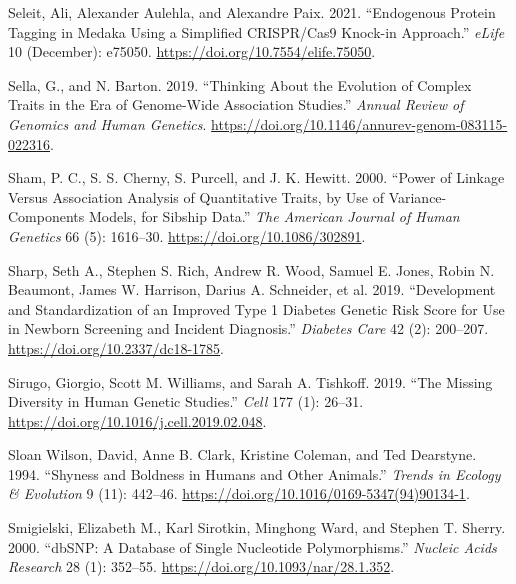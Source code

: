 \documentclass[
]{book}
\newlength{\cslhangindent}
\newlength{\cslentryspacingunit} %
\newenvironment{CSLReferences}[2] %
 {%
  \setlength{\parindent}{0pt}
  \ifodd #1
  \let\oldpar\par
  \def\par{\hangindent=\cslhangindent\oldpar}
  \fi
  \setlength{\parskip}{#2\cslentryspacingunit}
 }%
 {}
\begin{document}
\begin{CSLReferences}{1}{0}
\leavevmode{}%
Seleit, Ali, Alexander Aulehla, and Alexandre Paix. 2021. {``Endogenous Protein Tagging in Medaka Using a Simplified {CRISPR}/{Cas9} Knock-in Approach.''} \emph{eLife} 10 (December): e75050. \url{https://doi.org/10.7554/elife.75050}.

\leavevmode{}%
Sella, G., and N. Barton. 2019. {``Thinking {About} the {Evolution} of {Complex Traits} in the {Era} of {Genome-Wide Association Studies}.''} \emph{Annual Review of Genomics and Human Genetics}. \url{https://doi.org/10.1146/annurev-genom-083115-022316}.

\leavevmode{}%
Sham, P. C., S. S. Cherny, S. Purcell, and J. K. Hewitt. 2000. {``Power of {Linkage} Versus {Association Analysis} of {Quantitative Traits}, by {Use} of {Variance-Components Models}, for {Sibship Data}.''} \emph{The American Journal of Human Genetics} 66 (5): 1616--30. \url{https://doi.org/10.1086/302891}.

\leavevmode{}%
Sharp, Seth A., Stephen S. Rich, Andrew R. Wood, Samuel E. Jones, Robin N. Beaumont, James W. Harrison, Darius A. Schneider, et al. 2019. {``Development and {Standardization} of an {Improved Type} 1 {Diabetes Genetic Risk Score} for {Use} in {Newborn Screening} and {Incident Diagnosis}.''} \emph{Diabetes Care} 42 (2): 200--207. \url{https://doi.org/10.2337/dc18-1785}.

\leavevmode{}%
Sirugo, Giorgio, Scott M. Williams, and Sarah A. Tishkoff. 2019. {``The {Missing Diversity} in {Human Genetic Studies}.''} \emph{Cell} 177 (1): 26--31. \url{https://doi.org/10.1016/j.cell.2019.02.048}.

\leavevmode{}%
Sloan Wilson, David, Anne B. Clark, Kristine Coleman, and Ted Dearstyne. 1994. {``Shyness and Boldness in Humans and Other Animals.''} \emph{Trends in Ecology \& Evolution} 9 (11): 442--46. \url{https://doi.org/10.1016/0169-5347(94)90134-1}.

\leavevmode{}%
Smigielski, Elizabeth M., Karl Sirotkin, Minghong Ward, and Stephen T. Sherry. 2000. {``{dbSNP}: A Database of Single Nucleotide Polymorphisms.''} \emph{Nucleic Acids Research} 28 (1): 352--55. \url{https://doi.org/10.1093/nar/28.1.352}.


\end{CSLReferences}
\end{document}

